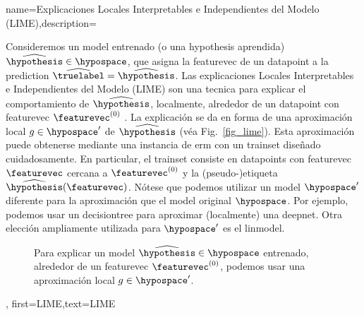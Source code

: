 {
{name={Explicaciones Locales Interpretables e Independientes del Modelo (LIME)},description={
		Consideremos 
		un \gls{model} entrenado (o una \gls{hypothesis aprendida}) $\widehat{\hypothesis} \in \hypospace$, 
		que asigna la \gls{featurevec} de un \gls{datapoint} a la \gls{prediction} $\widehat{\truelabel}= \widehat{\hypothesis}$. 
		Las explicaciones Locales Interpretables e Independientes del Modelo (LIME) son una tecnica para explicar 
		el comportamiento de $\widehat{\hypothesis}$, localmente, alrededor de un \gls{datapoint} con \gls{featurevec} $\featurevec^{(0)}$ \cite{Ribeiro2016}. 
		La explicación se da en forma de una aproximación local $g \in \hypospace'$ de $\widehat{\hypothesis}$ (véa Fig.\ \ref{fig_lime}). 
		Esta aproximación puede obtenerse mediante una instancia de \gls{erm} con un 
		\gls{trainset} diseñado cuidadosamente. En particular, el \gls{trainset} consiste en \gls{datapoint}s con 
		\gls{featurevec} $\featurevec$ cercana a $\featurevec^{(0)}$ y la (pseudo-)etiqueta $\widehat{\hypothesis}(\featurevec)$. 
		Nótese que podemos utilizar un \gls{model} $\hypospace'$ diferente para la aproximación que 
		el \gls{model} original $\hypospace$. Por ejemplo, podemos usar un \gls{decisiontree} 
		para aproximar (localmente) una \gls{deepnet}. Otra elección ampliamente utilizada para $\hypospace'$ es 
		el \gls{linmodel}. 
		\begin{figure}[htbp]
		\begin{center}
		\end{center}
		\caption{Para explicar un \gls{model} $\widehat{\hypothesis} \in \hypospace$ entrenado, alrededor de un \gls{featurevec} $\featurevec^{(0)}$, podemos usar una aproximación local $g \in \hypospace'$. }
		\end{figure}\label{fig_lime}},
	first={LIME},text={LIME}
}



}

